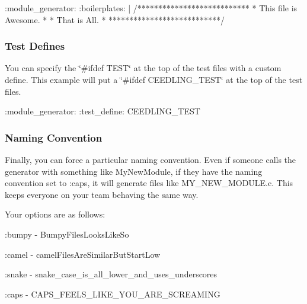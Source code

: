 \begin{DoxyCode}
:module\_generator:
  :boilerplates: |
    /***************************
    * This file is Awesome.    *
    * That is All.             *
    ***************************/
\end{DoxyCode}


\subsubsection*{Test Defines}

You can specify the \char`\"{}\#ifdef T\+E\+S\+T\char`\"{} at the top of the test files with a custom define. This example will put a \char`\"{}\#ifdef C\+E\+E\+D\+L\+I\+N\+G\+\_\+\+T\+E\+S\+T\char`\"{} at the top of the test files.


\begin{DoxyCode}
:module\_generator:
  :test\_define: CEEDLING\_TEST
\end{DoxyCode}


\subsubsection*{Naming Convention}

Finally, you can force a particular naming convention. Even if someone calls the generator with something like {\ttfamily My\+New\+Module}, if they have the naming convention set to {\ttfamily \+:caps}, it will generate files like {\ttfamily M\+Y\+\_\+\+N\+E\+W\+\_\+\+M\+O\+D\+U\+L\+E.\+c}. This keeps everyone on your team behaving the same way.

Your options are as follows\+:


\begin{DoxyItemize}
\item {\ttfamily \+:bumpy} -\/ Bumpy\+Files\+Looks\+Like\+So
\item {\ttfamily \+:camel} -\/ camel\+Files\+Are\+Similar\+But\+Start\+Low
\item {\ttfamily \+:snake} -\/ snake\+\_\+case\+\_\+is\+\_\+all\+\_\+lower\+\_\+and\+\_\+uses\+\_\+underscores
\item {\ttfamily \+:caps} -\/ C\+A\+P\+S\+\_\+\+F\+E\+E\+L\+S\+\_\+\+L\+I\+K\+E\+\_\+\+Y\+O\+U\+\_\+\+A\+R\+E\+\_\+\+S\+C\+R\+E\+A\+M\+I\+NG 
\end{DoxyItemize}